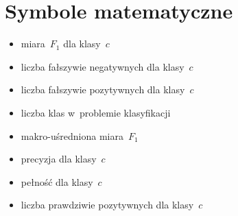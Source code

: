 \section*{Symbole matematyczne}

\begin{itemize}
\item[$F_{1,c}$] miara~$F_1$ dla klasy~$c$
\item[$FN_c$] liczba fałszywie negatywnych dla klasy~$c$
\item[$FP_c$] liczba fałszywie pozytywnych dla klasy~$c$
\item[$|C|$] liczba klas w~problemie klasyfikacji
\item[$\overline{F_1}$] makro-uśredniona miara~$F_1$
\item[$P_c$] precyzja dla klasy~$c$
\item[$R_c$] pełność dla klasy~$c$
\item[$TP_c$] liczba prawdziwie pozytywnych dla klasy~$c$
\end{itemize}
